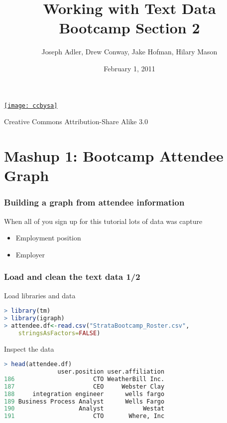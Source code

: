 \documentclass[xcolor=dvipsnames, 9pt]{beamer}
\title{Working with Text Data\\Bootcamp Section 2}
\author{Joseph Adler, Drew Conway, Jake Hofman, Hilary Mason}
\date{February 1, 2011}
\begin{document}
 

\begin{frame}[plain]
  \titlepage 
  
  \tiny
  \href{http://creativecommons.org/licenses/by-sa/3.0/us/}{\texttt{[image: ccbysa]}}

  Creative Commons Attribution-Share Alike 3.0
\end{frame}

\section{Mashup 1: Bootcamp Attendee Graph} %
\label{sec:mashup_1_bootcamp_attendee_graph}

\begin{frame}[fragile]
    \frametitle{Building a graph from attendee information}
    When all of you sign up for this tutorial lots of data was capture
    \begin{itemize}
        \item Employment position
        \item Employer
    \end{itemize}
    \vspace{2mm}
    \vspace{2mm}
\end{frame}

\begin{frame}[fragile]
    \frametitle{Load and clean the text data 1/2}
    \begin{block}{Load libraries and data}
        \begin{lstlisting}[language=R]
> library(tm)
> library(igraph)
> attendee.df<-read.csv("StrataBootcamp_Roster.csv",
    stringsAsFactors=FALSE)
        \end{lstlisting}
    \end{block}
    \begin{block}{Inspect the data}
        \begin{lstlisting}[language=R]
> head(attendee.df)
               user.position user.affiliation
186                      CTO WeatherBill Inc.
187                      CEO     Webster Clay
188     integration engineer      wells fargo
189 Business Process Analyst      Wells Fargo
190                  Analyst           Westat
191                      CTO       Where, Inc
        \end{lstlisting}
    \end{block}
\end{frame}
\end{document}
